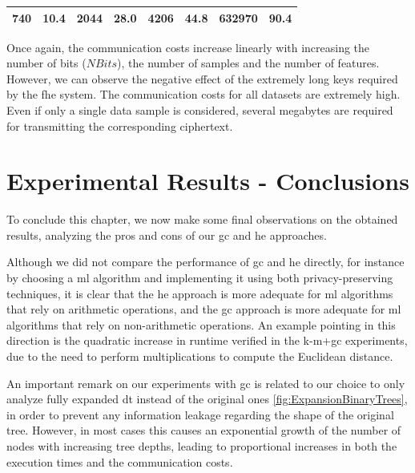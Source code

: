 \begin{table}[H]
\begin{tabular}{|c|c|c|c|c|c|c|c|}
740                                                         & 10.4                                                    & 2044                                                        & 28.0                                                    & 4206                                                        & 44.8                                                    & 632970                                                      & 90.4                                                    \\ \hline
\end{tabular}
\end{table}

Once again, the communication costs increase linearly with increasing the number of bits ($NBits$), the number of samples and the number of features. However, we can observe the negative effect of the extremely long keys required by the \ac{fhe} system. The communication costs for all datasets are extremely high. Even if only a single data sample is considered, several megabytes are required for transmitting the corresponding ciphertext.



\section{Experimental Results - Conclusions}
\label{sec:ExperimentalResultsConclusion}


To conclude this chapter, we now make some final observations on the obtained results, analyzing the pros and cons of our \ac{gc} and \ac{he} approaches.

Although we did not compare the performance of \ac{gc} and \ac{he} directly, for instance by choosing a \ac{ml} algorithm and implementing it using both privacy-preserving techniques, it is clear that the \ac{he} approach is more adequate for \ac{ml} algorithms that rely on arithmetic operations, and the \ac{gc} approach is more adequate for \ac{ml} algorithms that rely on non-arithmetic operations. An example pointing in this direction is the quadratic increase in runtime verified in the \ac{k-m}+\ac{gc} experiments, due to the need to perform multiplications to compute the Euclidean distance.

An important remark on our experiments with \ac{gc} is related to our choice to only analyze fully expanded \ac{dt} instead of the original ones \ref{fig:ExpansionBinaryTrees}, in order to prevent any information leakage regarding the shape of the original tree. However, in most cases this causes an exponential growth of the number of nodes with increasing tree depths, leading to proportional increases in both the execution times and the communication costs.
  

